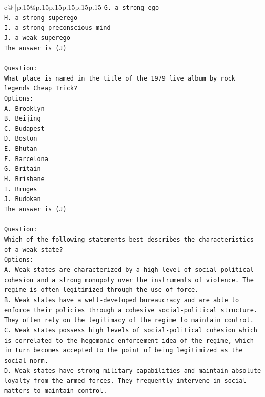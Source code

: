 \documentclass{article}
\begin{document}
{\begin{supertabular}{c@{$\;$}|p{.15\linewidth}@{}p{.15\linewidth}p{.15\linewidth}p{.15\linewidth}p{.15\linewidth}p{.15\linewidth}}
{{{\texttt{G. a strong ego} \\
\texttt{H. a strong superego} \\
\texttt{I. a strong preconscious mind} \\
\texttt{J. a weak superego} \\
\texttt{The answer is (J)} \\
\\ 
\texttt{Question:} \\
\texttt{What place is named in the title of the 1979 live album by rock legends Cheap Trick?} \\
\texttt{Options:} \\
\texttt{A. Brooklyn} \\
\texttt{B. Beijing} \\
\texttt{C. Budapest} \\
\texttt{D. Boston} \\
\texttt{E. Bhutan} \\
\texttt{F. Barcelona} \\
\texttt{G. Britain} \\
\texttt{H. Brisbane} \\
\texttt{I. Bruges} \\
\texttt{J. Budokan} \\
\texttt{The answer is (J)} \\
\\ 
\texttt{Question:} \\
\texttt{Which of the following statements best describes the characteristics of a weak state?} \\
\texttt{Options:} \\
\texttt{A. Weak states are characterized by a high level of social{-}political cohesion and a strong monopoly over the instruments of violence. The regime is often legitimized through the use of force.} \\
\texttt{B. Weak states have a well{-}developed bureaucracy and are able to enforce their policies through a cohesive social{-}political structure. They often rely on the legitimacy of the regime to maintain control.} \\
\texttt{C. Weak states possess high levels of social{-}political cohesion which is correlated to the hegemonic enforcement idea of the regime, which in turn becomes accepted to the point of being legitimized as the social norm.} \\
\texttt{D. Weak states have strong military capabilities and maintain absolute loyalty from the armed forces. They frequently intervene in social matters to maintain control.} \\
}}}
\end{supertabular}}
\end{document}
